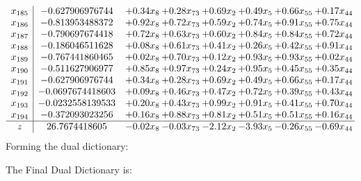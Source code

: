 \documentclass[8pt]{article}
\begin{document}
\[\begin{array}{c| c c@{\hskip 2pt} c@{\hskip 2pt} c@{\hskip 2pt} c@{\hskip 2pt} c@{\hskip 2pt} c@{\hskip 2pt} }
 x_{185}   &  -0.627906976744 & +  0.34 x_{8} & +  0.28 x_{73} & +  0.69 x_{2} & +  0.49 x_{5} & +  0.66 x_{55} & +  0.17 x_{44}\\
 x_{186}   &  -0.813953488372 & +  0.92 x_{8} & +  0.72 x_{73} & +  0.59 x_{2} & +  0.74 x_{5} & +  0.91 x_{55} & +  0.75 x_{44}\\
 x_{187}   &  -0.790697674418 & +  0.72 x_{8} & +  0.63 x_{73} & +  0.60 x_{2} & +  0.84 x_{5} & +  0.84 x_{55} & +  0.72 x_{44}\\
 x_{188}   &  -0.186046511628 & +  0.08 x_{8} & +  0.61 x_{73} & +  0.41 x_{2} & +  0.26 x_{5} & +  0.42 x_{55} & +  0.91 x_{44}\\
 x_{189}   &  -0.767441860465 & +  0.02 x_{8} & +  0.70 x_{73} & +  0.12 x_{2} & +  0.93 x_{5} & +  0.93 x_{55} & +  0.02 x_{44}\\
 x_{190}   &  -0.511627906977 & +  0.85 x_{8} & +  0.97 x_{73} & +  0.24 x_{2} & +  0.95 x_{5} & +  0.45 x_{55} & +  0.35 x_{44}\\
 x_{191}   &  -0.627906976744 & +  0.34 x_{8} & +  0.28 x_{73} & +  0.69 x_{2} & +  0.49 x_{5} & +  0.66 x_{55} & +  0.17 x_{44}\\
 x_{192}   &  -0.0697674418603 & +  0.09 x_{8} & +  0.46 x_{73} & +  0.47 x_{2} & +  0.72 x_{5} & +  0.39 x_{55} & +  0.43 x_{44}\\
 x_{193}   &  -0.0232558139533 & +  0.20 x_{8} & +  0.43 x_{73} & +  0.99 x_{2} & +  0.91 x_{5} & +  0.41 x_{55} & +  0.70 x_{44}\\
 x_{194}   &  -0.372093023256 & +  0.16 x_{8} & +  0.88 x_{73} & +  0.81 x_{2} & +  0.51 x_{5} & +  0.51 x_{55} & +  0.16 x_{44}\\
\hline
z    &  26.7674418605 & -0.02 x_{8} & -0.03 x_{73} & -2.12 x_{2} & -3.93 x_{5} & -0.26 x_{55} & -0.69 x_{44}\\
\end{array}\]
Forming the dual dictionary:

The Final Dual Dictionary is: 
\end{document}
